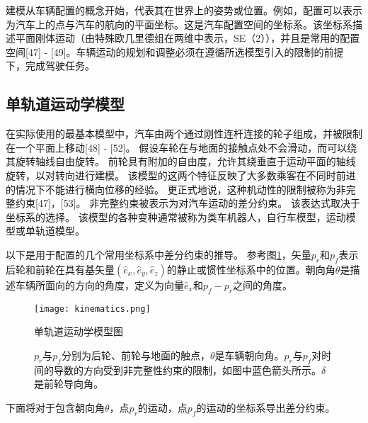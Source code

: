 建模从车辆配置的概念开始，代表其在世界上的姿势或位置。例如，配置可以表示为汽车上的点与汽车的航向的平面坐标。这是汽车配置空间的坐标系。该坐标系描述平面刚体运动（由特殊欧几里德组在两维中表示，SE（2）），并且是常用的配置空间[47] - [49]。车辆运动的规划和调整必须在遵循所选模型引入的限制的前提下，完成驾驶任务。

\subsection{单轨道运动学模型}
在实际使用的最基本模型中，汽车由两个通过刚性连杆连接的轮子组成，并被限制在一个平面上移动[48] - [52]。 假设车轮在与地面的接触点处不会滑动，而可以绕其旋转轴线自由旋转。 前轮具有附加的自由度，允许其绕垂直于运动平面的轴线旋转，以对转向进行建模。 该模型的这两个特征反映了大多数乘客在不同时前进的情况下不能进行横向位移的经验。 更正式地说，这种机动性的限制被称为非完整约束[47]，[53]。 非完整约束被表示为对汽车运动的差分约束。 该表达式取决于坐标系的选择。 该模型的各种变种通常被称为类车机器人，自行车模型，运动模型或单轨道模型。

以下是用于配置的几个常用坐标系中差分约束的推导。 参考图\ref{fig:kinematics}，矢量$p_r$和$p_f$表示后轮和前轮在具有基矢量$(\hat{e}_x, \hat{e}_y, \hat{e}_z)$的静止或惯性坐标系中的位置。朝向角$\theta$是描述车辆所面向的方向的角度，定义为向量$\hat{e}_x$和$p_f-p_r$之间的角度。
\begin{figure}
\centering
\texttt{[image: kinematics.png]}
\caption{单轨道运动学模型图}
\caption*{$p_r$与$p_f$分别为后轮、前轮与地面的触点，$\theta$是车辆朝向角。$p_r$与$p_f$对时间的导数的方向受到非完整性约束的限制，如图中蓝色箭头所示。$\delta$是前轮导向角。}
\label{fig:kinematics}
\end{figure}

下面将对于包含朝向角$\theta$，点$p_r$的运动，点$p_f$的运动的坐标系导出差分约束。

